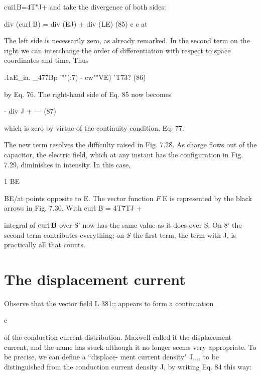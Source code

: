 \begin{equation}
\end{equation}
cui1B=4T"J+%
and take the divergence of both sides:

\begin{equation}
\end{equation}
div (curl B) = div (EJ) + div (LE) (85)
c c at

The left side is necessarily zero, as already remarked. In the second
term on the right we can interchange the order of differentiation with
respect to space coordinates and time. Thus

\begin{equation}
\end{equation}
.1aE_ia. _477Bp
'""(:7) - cw""VE) 'T73? (86)

by Eq. 76. The right-hand side of Eq. 85 now becomes

\begin{equation}
\end{equation}
- div J + --- (87)

which is zero by virtue of the continuity condition, Eq. 77.

The new term resolves the difficulty raised in Fig. 7.28. As charge
flows out of the capacitor, the electric field, which at any instant has
the configuration in Fig. 7.29, diminishes in intensity. In this case,

\begin{equation}
\end{equation}
1 BE

BE/at points opposite to E. The vector function $F$ E is represented
by the black arrows in Fig. 7.30. With curl B = 4T7TJ + %

integral of $\operatorname{curl}\mathbf{B}$ over S' now has the same value as it does over S.
On 8' the second term contributes everything; on $S$ the first term, the
term with J, is practically all that counts.

\section{The displacement current}

Observe that the vector field L 381;; appears to form a continuation

c

of the conduction current distribution. Maxwell called it the displacement
current, and the name has stuck although it no longer
seems very appropriate. To be precise, we can define a ``displace-
ment current density" J,,,, to be distinguished from the conduction
current density J, by writing Eq. 84 this way:

